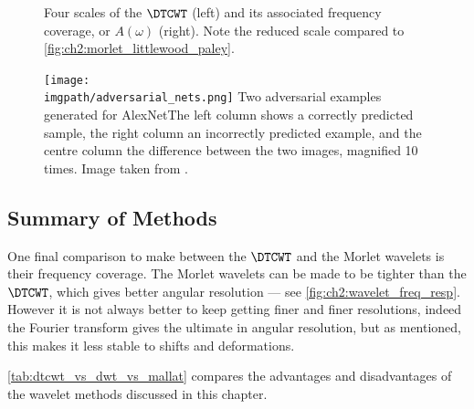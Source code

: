   \begin{figure}
    \caption[$\DTCWT$ basis functions and their frequency coverage]
    {Four scales of the $\DTCWT$ (left) and its associated frequency
    coverage, or $A(\omega)$ (right). Note the reduced scale compared to \autoref{fig:ch2:morlet_littlewood_paley}.}
    \label{fig:ch2:dtcwt_lwoodpaley}
  \end{figure}

  \begin{figure}
    \centering
    \texttt{[image: \\imgpath/adversarial\_nets.png]}
    \mycaption
    {Two adversarial examples generated for AlexNet}{The left column
    shows a correctly predicted sample, the right column an incorrectly
    predicted example, and the centre column the difference between the two
    images, magnified 10 times. Image taken from
    \cite{szegedy_intriguing_2013}.}
    \label{fig:ch2:difference}
  \end{figure}
\subsection{Summary of Methods}
  One final comparison to make between the $\DTCWT$ and the Morlet wavelets is
  their frequency coverage. The Morlet wavelets can be made to be tighter than
  the $\DTCWT$, which gives better angular resolution --- see
  \autoref{fig:ch2:wavelet_freq_resp}. However it is not always
  better to keep getting finer and finer resolutions, indeed the Fourier
  transform gives the ultimate in angular resolution, but as mentioned, this
  makes it less stable to shifts and deformations. 

  \autoref{tab:dtcwt_vs_dwt_vs_mallat} compares the advantages and
  disadvantages of the wavelet methods discussed in this chapter.

